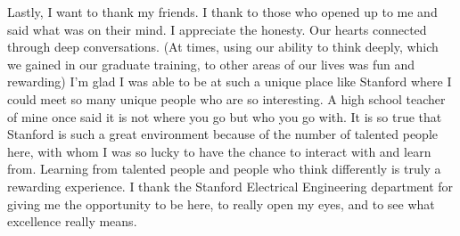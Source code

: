 Lastly, I want to thank my friends. I thank to those who opened up to me and said what was on their mind. I appreciate the honesty. Our hearts connected through deep conversations. (At times, using our ability to think deeply, which we gained in our graduate training, to other areas of our lives was fun and rewarding) I'm glad I was able to be at such a unique place like Stanford where I could meet so many unique people who are so interesting. A high school teacher of mine once said it is not where you go but who you go with. It is so true that Stanford is such a great environment because of the number of talented people here, with whom I was so lucky to have the chance to interact with and learn from. Learning from talented people and people who think differently is truly a rewarding experience. I thank the Stanford Electrical Engineering department for giving me the opportunity to be here, to really open my eyes, and to see what excellence really means.